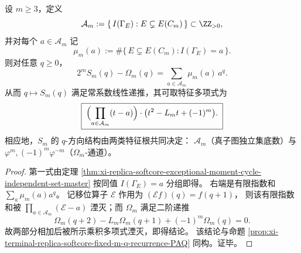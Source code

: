 \begin{corollary}\label{cor:xi-replica-softcore-fixed-m-q-recurrence-characteristic-roots}
设 \(m\ge 3\)，定义
\[
\mathcal A_m:=\{\,I(\Gamma_E):E\subsetneq E(C_m)\,\}\subset\ZZ_{>0},
\]
并对每个 \(a\in\mathcal A_m\) 记
\[
\mu_m(a):=\#\{\,E\subsetneq E(C_m):I(\Gamma_E)=a\,\}.
\]
则对任意 \(q\ge 0\)，
\[
2^mS_m(q)-\Omega_m(q)=\sum_{a\in\mathcal A_m}\mu_m(a)\,a^q.
\]
从而 \(q\mapsto S_m(q)\) 满足常系数线性递推，其可取特征多项式为
\[
\boxed{\;
\Bigl(\prod_{a\in\mathcal A_m}(t-a)\Bigr)\cdot\bigl(t^2-L_m t+(-1)^m\bigr).\;}
\]
相应地，\(S_m\) 的 \(q\)-方向结构由两类特征根共同决定：
\(\mathcal A_m\)（真子图独立集底数）与
\(\varphi^m,(-1)^m\varphi^{-m}\)（\(\Omega_m\)-通道）。
\end{corollary}
\begin{proof}
第一式由定理
\ref{thm:xi-replica-softcore-exceptional-moment-cycle-independent-set-master}
按同值 \(I(\Gamma_E)=a\) 分组即得。
右端是有限指数和 \(\sum_a\mu_m(a)a^q\)。
记移位算子 \(\mathscr E\) 作用为 \((\mathscr E f)(q)=f(q+1)\)，
则该有限指数和被
\(
\prod_{a\in\mathcal A_m}(\mathscr E-a)
\)
湮灭；而 \(\Omega_m\) 满足二阶递推
\[
\Omega_m(q+2)-L_m\Omega_m(q+1)+(-1)^m\Omega_m(q)=0.
\]
故两部分相加后被所示乘积多项式湮灭，即得结论。
该结论与命题 \ref{prop:xi-terminal-replica-softcore-fixed-m-q-recurrence-PAQ}
同构。证毕。
\end{proof}

\endinput
